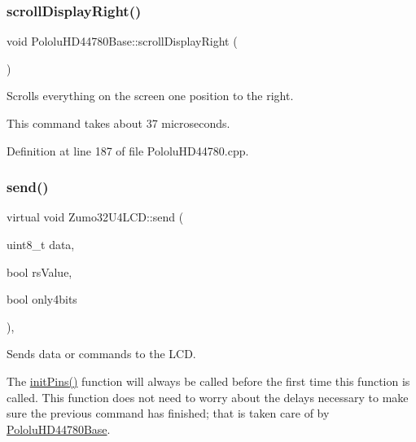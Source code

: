 \mbox{\label{class_pololu_h_d44780_base_a411512707f303af75de3c5aea313bf48}} 
\subsubsection{\texorpdfstring{scroll\+Display\+Right()}{scrollDisplayRight()}}
{\footnotesize\ttfamily void Pololu\+H\+D44780\+Base\+::scroll\+Display\+Right (\begin{DoxyParamCaption}{ }\end{DoxyParamCaption})\hspace{0.3cm}{\ttfamily [inherited]}}

Scrolls everything on the screen one position to the right.

This command takes about 37 microseconds. 

Definition at line 187 of file Pololu\+H\+D44780.\+cpp.

\mbox{\label{class_zumo32_u4_l_c_d_a219e5ae0c67b8a5fd359c397c69ab713}} 
\subsubsection{\texorpdfstring{send()}{send()}}
{\footnotesize\ttfamily virtual void Zumo32\+U4\+L\+C\+D\+::send (\begin{DoxyParamCaption}\item[{uint8\+\_\+t}]{data,  }\item[{bool}]{rs\+Value,  }\item[{bool}]{only4bits }\end{DoxyParamCaption})\hspace{0.3cm}{\ttfamily [inline]}, {\ttfamily [virtual]}}

Sends data or commands to the L\+CD.

The \hyperlink{class_zumo32_u4_l_c_d_a15ad296b2faa2196760b816301983ea5}{init\+Pins()} function will always be called before the first time this function is called. This function does not need to worry about the delays necessary to make sure the previous command has finished; that is taken care of by \hyperlink{class_pololu_h_d44780_base}{Pololu\+H\+D44780\+Base}.

